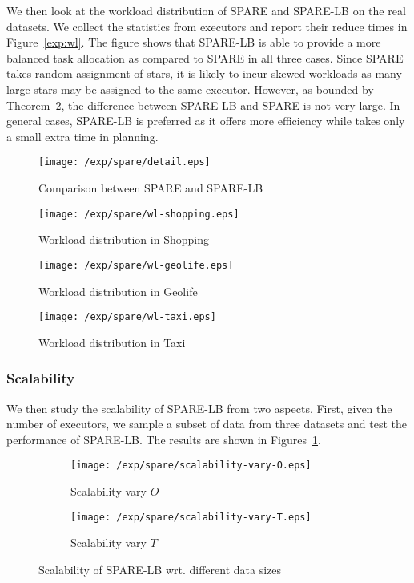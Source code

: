 We then look at the workload distribution of SPARE and SPARE-LB on the
real datasets. We collect the statistics from executors
and report their reduce times in Figure~\ref{exp:wl}. The figure shows
 that SPARE-LB is able to provide a more balanced task allocation
 as compared to SPARE in all three cases. Since SPARE takes random assignment
of stars, it is likely to incur skewed workloads as many large stars 
may be assigned to the same executor. 
However, as bounded by Theorem~2, the difference between
SPARE-LB and SPARE is not very large. In general cases, SPARE-LB is preferred
as it offers more efficiency while takes only a small extra time in planning.

\begin{figure*}[t]
\centering
	\begin{subfigure}[b]{0.22\textwidth}
        \texttt{[image: /exp/spare/detail.eps]}
        \caption{Comparison between SPARE and SPARE-LB}
    \end{subfigure}
 	 \begin{subfigure}[b]{0.22\textwidth}
        \texttt{[image: /exp/spare/wl-shopping.eps]}
        \caption{Workload distribution in Shopping}
    \end{subfigure}
    \begin{subfigure}[b]{0.22\textwidth}
        \texttt{[image: /exp/spare/wl-geolife.eps]}
        \caption{Workload distribution in Geolife}
    \end{subfigure}  
    \begin{subfigure}[b]{0.22\textwidth}
        \texttt{[image: /exp/spare/wl-taxi.eps]}
        \caption{Workload distribution in Taxi}
    \end{subfigure}
\caption{Load balance of SPARE and SPARE-LB in real datasets}
\label{exp:wl}
\end{figure*}


\subsubsection{Scalability}
We then study the scalability of SPARE-LB from two aspects. First, given
the number of executors, we sample a subset of data from three datasets
and test the performance of SPARE-LB. The results are shown in Figures~\ref{fig:scalability-wl}.
\begin{figure}[h]
\begin{subfigure}[b]{0.22\textwidth}
\centering
    \texttt{[image: /exp/spare/scalability-vary-O.eps]}
        \caption{Scalability vary $O$}
    \end{subfigure}
 	 \begin{subfigure}[b]{0.22\textwidth}
        \texttt{[image: /exp/spare/scalability-vary-T.eps]}
        \caption{Scalability vary $T$}
    \end{subfigure}
 \caption{Scalability of SPARE-LB wrt. different data sizes}
 \label{fig:scalability-wl}
\end{figure}

